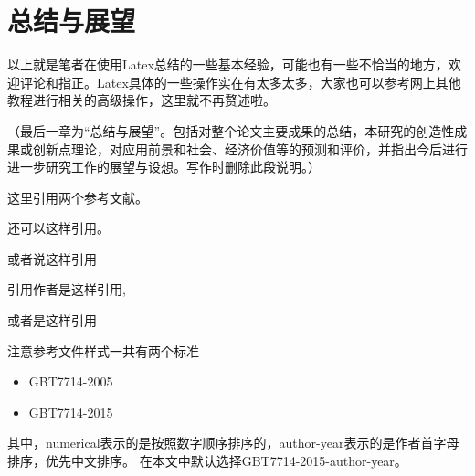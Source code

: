 \chapter{总结与展望}


以上就是笔者在使用Latex总结的一些基本经验，可能也有一些不恰当的地方，欢迎评论和指正。Latex具体的一些操作实在有太多太多，大家也可以参考网上其他教程进行相关的高级操作，这里就不再赘述啦。

（最后一章为“总结与展望”。包括对整个论文主要成果的总结，本研究的创造性成果或创新点理论，对应用前景和社会、经济价值等的预测和评价，并指出今后进行进一步研究工作的展望与设想。写作时删除此段说明。）

这里引用两个参考文献\cite{2001Applying}\cite{2004PSO_ZhangLibiao}。

还可以这样引用\cite{2001Applying,2021A}。

或者说这样引用\cite{2001Applying,2004PSO_ZhangLibiao,2021A}

引用作者是这样引用\citet{2001Applying},\citet{2004PSO_ZhangLibiao}

或者是这样引用\citep{2001Applying}

注意参考文件样式一共有两个标准

\begin{itemize}
    \item GBT7714-2005
    \item GBT7714-2015
\end{itemize}

其中，numerical表示的是按照数字顺序排序的，author-year表示的是作者首字母排序，优先中文排序。
在本文中默认选择GBT7714-2015-author-year。
